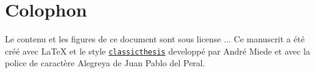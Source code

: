 
\pagestyle{empty}


\section*{Colophon}

Le contenu et les figures de ce document sont sous license ...
Ce manuscrit a été créé avec LaTeX et le style \href{https://github.com/classicthesis}{\texttt{classicthesis}} developpé par Andr\'e Miede et avec la police de caractère Alegreya de Juan Pablo del Peral.

